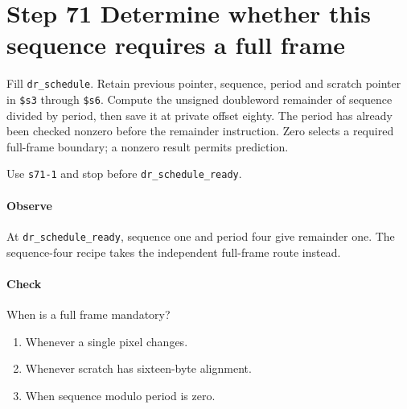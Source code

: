 \section{Step 71 Determine whether this sequence requires a full frame}
Fill \texttt{dr\_schedule}. Retain previous pointer, sequence, period and scratch pointer in \texttt{\$s3} through \texttt{\$s6}. Compute the unsigned doubleword remainder of sequence divided by period, then save it at private offset eighty. The period has already been checked nonzero before the remainder instruction. Zero selects a required full-frame boundary; a nonzero result permits prediction.

Use \texttt{s71-1} and stop before \texttt{dr\_schedule\_ready}.

\paragraph{Observe} At \texttt{dr\_schedule\_ready}, sequence one and period four give remainder one. The sequence-four recipe takes the independent full-frame route instead.

\paragraph{Check} When is a full frame mandatory?
\begin{enumerate}[label=\Alph*.]
\item Whenever a single pixel changes.
\item Whenever scratch has sixteen-byte alignment.
\item When sequence modulo period is zero.
\end{enumerate}
